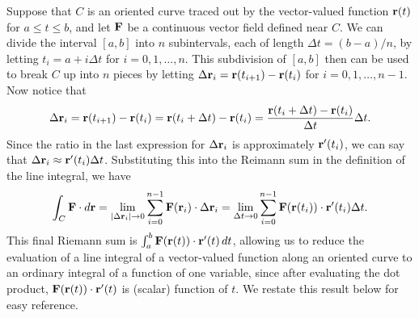 Suppose that $C$ is an oriented curve traced out by the vector-valued
function $\mathbf{r}(t)$ for $a\leq t\leq b$, and let $\mathbf{F}$ be a continuous
vector field defined near $C$. We can divide the interval $[a,b]$ into $n$
subintervals, each of length $\Delta t = (b-a)/n$, by letting $t_i = a
+ i\Delta t$ for $i = 0,1,\dots,n$. This subdivision of $[a,b]$ then
can be used to break $C$ up into $n$ pieces by letting $\Delta \mathbf{r}_i =
\mathbf{r}(t_{i+1}) - \mathbf{r}(t_{i})$ for $i=0,1,\dots,n-1$.  Now notice that
\[\Delta \mathbf{r}_i = \mathbf{r}(t_{i+1}) - \mathbf{r}(t_{i}) = \mathbf{r}(t_{i} + \Delta t) -
\mathbf{r}(t_{i}) = \frac{\mathbf{r}(t_{i} + \Delta t) -
\mathbf{r}(t_{i})}{\Delta t}\Delta t.\]
Since the ratio in the last expression for $\Delta \mathbf{r}_i$ is
approximately $\mathbf{r}'(t_{i})$, we can say that $\Delta\mathbf{r}_i\approx
\mathbf{r}'(t_i)\Delta t$. Substituting this into the Reimann sum in the
definition of the line integral, we have
      \[\int_C \mathbf{F}\cdot d\mathbf{r} = \lim_{|\Delta\mathbf{r}_i|\to 0}
      \sum_{i=0}^{n-1}\mathbf{F}(\mathbf{r}_i)\cdot\Delta\mathbf{r}_i = \lim_{\Delta t\to
        0} \sum_{i=0}^{n-1} \mathbf{F}(\mathbf{r}(t_i))\cdot \mathbf{r}'(t_i)\Delta t.\]
This final Riemann sum is $\int_a^b \mathbf{F}(\mathbf{r}(t))\cdot \mathbf{r}'(t)\, dt$,
allowing us to reduce the evaluation of a line integral of a
vector-valued function along an oriented curve to an ordinary integral
of a function of one variable, since after evaluating the dot product,
$\mathbf{F}(\mathbf{r}(t))\cdot \mathbf{r}'(t)$ is (scalar) function of $t$. We restate
this result below for easy reference.


\vspace*{5pt}
\nin {} \vspace*{5pt}


